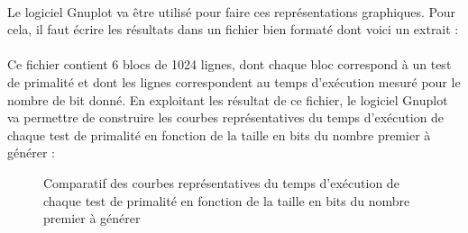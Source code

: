 			\paragraph{} Le logiciel {\ttfamily Gnuplot} va être utilisé pour faire ces représentations graphiques. Pour cela, il faut écrire les résultats dans un fichier bien formaté dont voici un extrait :
			
			
			\paragraph{}Ce fichier contient 6 blocs de 1024 lignes, dont chaque bloc correspond à un test de primalité et dont les lignes correspondent au temps d'exécution mesuré pour le nombre de bit donné. En exploitant les résultat de ce fichier, le logiciel {\ttfamily Gnuplot} va permettre de construire les courbes représentatives du temps d'exécution de chaque test de primalité en fonction de la taille en bits du nombre premier à générer :
			
			\begin{figure}[H]\vspace{-1em}\caption{Comparatif des courbes représentatives du temps d'exécution de chaque test de primalité en fonction de la taille en bits du nombre premier à générer}\label{fig:M4}\end{figure}
			
